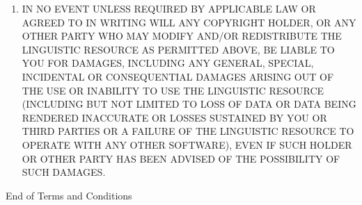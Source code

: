 \begin{enumerate}
\item
{\sc IN NO EVENT UNLESS REQUIRED BY APPLICABLE LAW OR AGREED TO IN WRITING WILL ANY 
COPYRIGHT HOLDER, OR ANY OTHER PARTY WHO MAY MODIFY AND/OR REDISTRIBUTE THE LINGUISTIC 
RESOURCE AS PERMITTED ABOVE, BE LIABLE TO YOU FOR DAMAGES, INCLUDING ANY GENERAL, 
SPECIAL, INCIDENTAL OR CONSEQUENTIAL DAMAGES ARISING OUT OF THE USE OR INABILITY TO 
USE THE LINGUISTIC RESOURCE (INCLUDING BUT NOT LIMITED TO LOSS OF DATA OR DATA BEING 
RENDERED INACCURATE OR LOSSES SUSTAINED BY YOU OR THIRD PARTIES OR A FAILURE OF THE 
LINGUISTIC RESOURCE TO OPERATE WITH ANY OTHER SOFTWARE), EVEN IF SUCH HOLDER OR OTHER 
PARTY HAS BEEN ADVISED OF THE POSSIBILITY OF SUCH DAMAGES.}

\end{enumerate}


\begin{center}
{\Large\sc End of Terms and Conditions}
\end{center}

